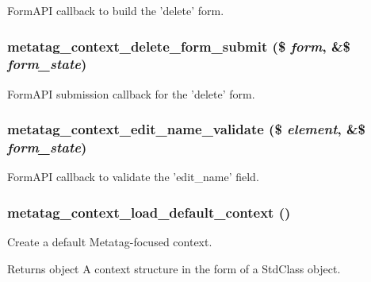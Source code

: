 FormAPI callback to build the 'delete' form. \hypertarget{metatag__context_8admin_8inc_a7404b24889dc878c5e2b99073e97c7ef}{
\subsubsection[{metatag\_\-context\_\-delete\_\-form\_\-submit}]{\setlength{\rightskip}{0pt plus 5cm}metatag\_\-context\_\-delete\_\-form\_\-submit (\$ {\em form}, \/  \&\$ {\em form\_\-state})}}
\label{metatag__context_8admin_8inc_a7404b24889dc878c5e2b99073e97c7ef}
FormAPI submission callback for the 'delete' form. \hypertarget{metatag__context_8admin_8inc_a6fc25775002756ee7790b2c84df64f24}{
\subsubsection[{metatag\_\-context\_\-edit\_\-name\_\-validate}]{\setlength{\rightskip}{0pt plus 5cm}metatag\_\-context\_\-edit\_\-name\_\-validate (\$ {\em element}, \/  \&\$ {\em form\_\-state})}}
\label{metatag__context_8admin_8inc_a6fc25775002756ee7790b2c84df64f24}
FormAPI callback to validate the 'edit\_\-name' field. \hypertarget{metatag__context_8admin_8inc_aac0873db0e0bc2432a0c467104d6299c}{
\subsubsection[{metatag\_\-context\_\-load\_\-default\_\-context}]{\setlength{\rightskip}{0pt plus 5cm}metatag\_\-context\_\-load\_\-default\_\-context ()}}
\label{metatag__context_8admin_8inc_aac0873db0e0bc2432a0c467104d6299c}
Create a default Metatag-\/focused context.

\begin{DoxyReturn}{Returns}
object A context structure in the form of a StdClass object. 
\end{DoxyReturn}

